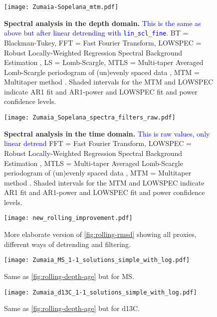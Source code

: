\documentclass[draft]{agujournal2019}
\newcommand{\ijk}{\textcolor{blue}}
\begin{document}
\begin{figure}[htb]
  \centering \texttt{[image: Zumaia-Sopelana\_mtm.pdf]}
  \caption{\label{fig:spectral-depth}
    \textbf{Spectral analysis in the depth domain.}
    \ijk{This is the same as above but after linear detrending with \texttt{lin\_scl\_fine}.}
    BT = Blackman-Tukey,
    FFT = Fast Fourier Transform,
    LOWSPEC = Robust Locally-Weighted Regression Spectral Background Estimation \cite{Meyers2012},
    LS = Lomb-Scargle,
    MTLS = Multi-taper Averaged Lomb-Scargle periodogram of (un)evenly
spaced data \cite{Springford2020},
    MTM = Multitaper method \cite{Thomson1982}.
    Shaded intervals for the MTM and LOWSPEC indicate AR1 fit and AR1-power and LOWSPEC fit and power confidence levels.
  }
\end{figure}


\begin{figure}[htb]
  \centering \texttt{[image: Zumaia\_Sopelana\_spectra\_filters\_raw.pdf]}
  \caption{\label{fig:spectral-age-raw}
    \textbf{Spectral analysis in the time domain.}
    \ijk{This is raw values, only linear detrend}
    FFT = Fast Fourier Transform,
    LOWSPEC = Robust Locally-Weighted Regression Spectral Background Estimation \cite{Meyers2012},
    MTLS = Multi-taper Averaged Lomb-Scargle periodogram of (un)evenly
spaced data \cite{Springford2020},
    MTM = Multitaper method \cite{Thomson1982}.
    Shaded intervals for the MTM and LOWSPEC indicate AR1 fit and AR1-power and LOWSPEC fit and power confidence levels.
  }
\end{figure}


\begin{figure}[htb]
  \centering \texttt{[image: new\_rolling\_improvement.pdf]}
  \caption{\label{fig:rolling-rmsd-improvement}
    More elaborate version of \cref{fig:rolling-rmsd} showing all proxies, different ways of detrending and filtering.}
\end{figure}


\begin{figure}[htb]
  \centering
  \texttt{[image: Zumaia\_MS\_1-1\_solutions\_simple\_with\_log.pdf]}
  \caption{\label{fig:rolling-age-MS}
    Same as \cref{fig:rolling-depth-age} but for \gls{MS}.}
\end{figure}

\begin{figure}[htb]
  \centering
  \texttt{[image: Zumaia\_d13C\_1-1\_solutions\_simple\_with\_log.pdf]}
  \caption{\label{fig:rolling-age-d13C}
    Same as \cref{fig:rolling-depth-age} but for \gls{d13C}.}
\end{figure}
\end{document}
